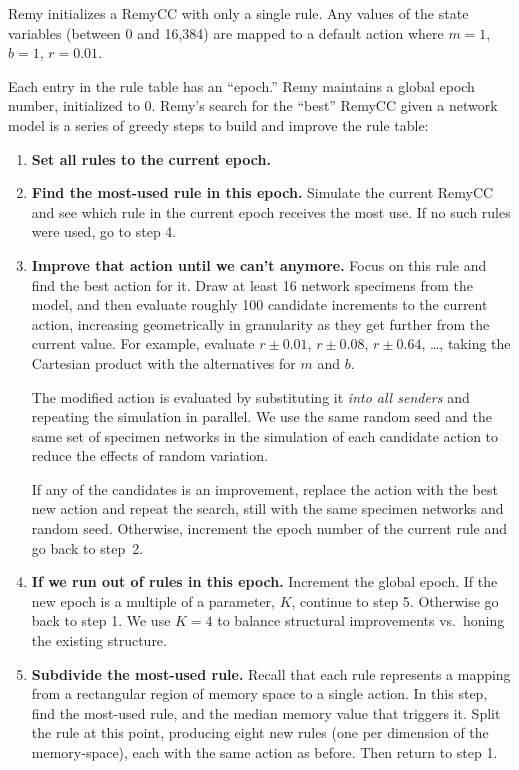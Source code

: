 
Remy initializes a RemyCC with only a single rule. Any values of the
state variables (between 0 and 16,384) are mapped to a default action
where $m = 1$, $b = 1$, $r = 0.01$.

Each entry in the rule table has an ``epoch.''
Remy maintains a global epoch number, initialized to 0. Remy's search
for the ``best'' RemyCC given a network model is a series of greedy
steps to build and improve the rule table:

\begin{enumerate}

\item\textbf{Set all rules to the current epoch.} 

\item \textbf{Find the most-used rule in this epoch.} Simulate the
  current RemyCC and see which rule in the current epoch
  receives the most use.  If no such rules were used, go
  to step 4.

\item \textbf{Improve that action until we can't anymore.} Focus on
  this rule and find the best action for it. Draw at least 16 network
  specimens from the model, and then evaluate roughly 100 candidate
  increments to the current action, increasing geometrically in
  granularity as they get further from the current value. For example,
  evaluate $r \pm 0.01$, $r \pm 0.08$, $r \pm 0.64$, \ldots, taking
  the Cartesian product with the alternatives for $m$ and $b$.

  The modified action is evaluated by substituting it \emph{into all
    senders} and repeating the simulation in parallel. We use the same
  random seed and the same set of specimen networks in the simulation of
  each candidate action to reduce the effects of random variation.

  If any of the candidates is an improvement, replace the action with
  the best new action and repeat the search, still with the same
  specimen networks and random seed. Otherwise, increment the epoch
  number of the current rule and go back to step~2.

\item \textbf{If we run out of rules in this epoch.} Increment the
  global epoch. If the new epoch is a multiple of a parameter, $K$,
  continue to step 5. Otherwise go back to step 1. We use $K = 4$ to
  balance structural improvements vs.~honing the existing structure.

\item \textbf{Subdivide the most-used rule.} Recall that each rule
  represents a mapping from a rectangular region of memory space to a
  single action. In this step, find the most-used rule, and the median
  memory value that triggers it. Split the rule at this point,
  producing eight new rules (one per dimension of the memory-space),
  each with the same action as before. Then return to step 1.

\end{enumerate}

